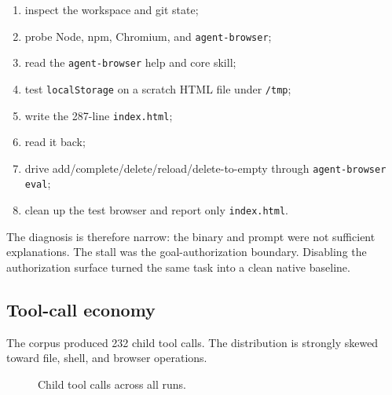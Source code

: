 \documentclass[11pt]{article}
\newcommand{\code}[1]{\texttt{#1}}
\begin{document}
\begin{enumerate}[leftmargin=1.5em]
\item inspect the workspace and git state;
\item probe Node, npm, Chromium, and \code{agent-browser};
\item read the \code{agent-browser} help and core skill;
\item test \code{localStorage} on a scratch HTML file under \code{/tmp};
\item write the 287-line \code{index.html};
\item read it back;
\item drive add/complete/delete/reload/delete-to-empty through
\code{agent-browser eval};
\item clean up the test browser and report only \code{index.html}.
\end{enumerate}

The diagnosis is therefore narrow: the binary and prompt were not sufficient
explanations.  The stall was the goal-authorization boundary.  Disabling the
authorization surface turned the same task into a clean native baseline.

\subsection{Tool-call economy}

The corpus produced 232 child tool calls.  The distribution is strongly
skewed toward file, shell, and browser operations.

\begin{figure}[h]
\centering
{}
\caption{Child tool calls across all runs.}
\end{figure}
\end{document}
